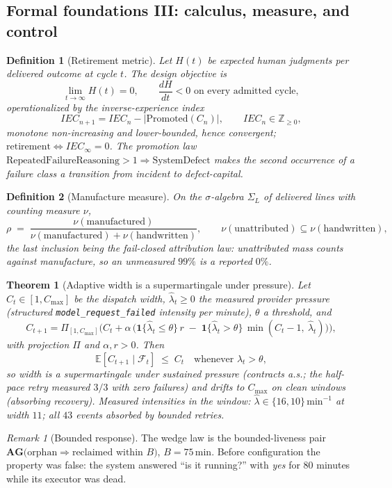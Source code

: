 \documentclass[11pt,a4paper]{article}
\newtheorem{definition}{Definition}
\newtheorem{theorem}{Theorem}
\theoremstyle{remark}
\newtheorem{remark}{Remark}
\newcommand{\term}[1]{\texttt{#1}}
\begin{document}
\subsection{Formal foundations III: calculus, measure, and control}
\begin{definition}[Retirement metric]\label{def:retire}
Let $H(t)$ be expected human judgments per delivered outcome at cycle $t$. The design objective is
\[
\lim_{t \to \infty} H(t) = 0, \qquad \frac{dH}{dt} < 0 \text{ on every admitted cycle},
\]
operationalized by the inverse-experience index
\[
IEC_{n+1} = IEC_n - \big|\mathrm{Promoted}(C_n)\big|, \qquad IEC_n \in \mathbb{Z}_{\ge 0},
\]
monotone non-increasing and lower-bounded, hence convergent; $\mathrm{retirement} \iff IEC_{\infty} = 0$. The promotion law $\mathrm{RepeatedFailureReasoning} > 1 \Rightarrow \mathrm{SystemDefect}$ makes the second occurrence of a failure class a transition from incident to defect-capital.
\end{definition}

\begin{definition}[Manufacture measure]\label{def:measure}
On the $\sigma$-algebra $\Sigma_L$ of delivered lines with counting measure $\nu$,
\[
\rho \;=\; \frac{\nu(\mathrm{manufactured})}{\nu(\mathrm{manufactured}) + \nu(\mathrm{handwritten})},
\qquad
\nu(\mathrm{unattributed}) \subseteq \nu(\mathrm{handwritten}),
\]
the last inclusion being the fail-closed attribution law: unattributed mass counts against manufacture, so an unmeasured $99\%$ is a reported $0\%$.
\end{definition}

\begin{theorem}[Adaptive width is a supermartingale under pressure]\label{thm:width}
Let $C_t \in [1, C_{\max}]$ be the dispatch width, $\hat{\lambda}_t \ge 0$ the measured provider pressure (structured \term{model\_request\_failed} intensity per minute), $\theta$ a threshold, and
\[
C_{t+1} = \Pi_{[1,C_{\max}]}\Big( C_t + \alpha\,\big( \mathbf{1}\{\hat{\lambda}_t \le \theta\}\, r \;-\; \mathbf{1}\{\hat{\lambda}_t > \theta\}\, \min(C_t - 1,\ \hat{\lambda}_t) \big) \Big),
\]
with projection $\Pi$ and $\alpha, r > 0$. Then
\[
\mathbb{E}\!\left[C_{t+1} \mid \mathcal{F}_t\right] \;\le\; C_t \quad\text{whenever } \hat{\lambda}_t > \theta,
\]
so width is a supermartingale under sustained pressure (contracts a.s.; the half-pace retry measured $3/3$ with zero failures) and drifts to $C_{\max}$ on clean windows (absorbing recovery). Measured intensities in the window: $\hat{\lambda} \in \{16, 10\}\,\mathrm{min}^{-1}$ at width $11$; all $43$ events absorbed by bounded retries.
\end{theorem}
\begin{remark}[Bounded response]
The wedge law is the bounded-liveness pair $\mathbf{AG}\big(\mathrm{orphan} \Rightarrow \text{reclaimed within } B\big)$, $B = 75\,\mathrm{min}$. Before configuration the property was false: the system answered ``is it running?'' with \emph{yes} for 80 minutes while its executor was dead.
\end{remark}
\end{document}

